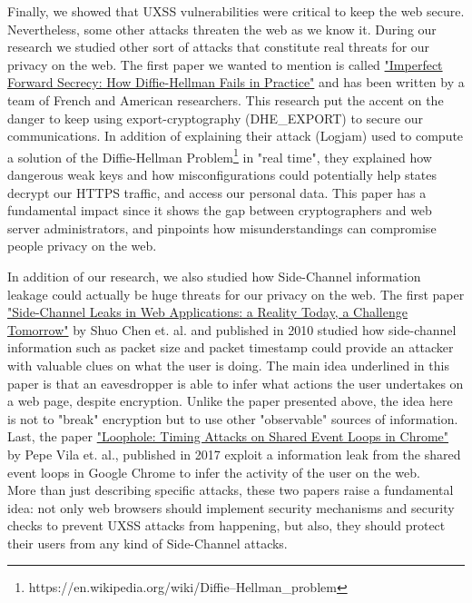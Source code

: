 \documentclass[journal]{IEEEtran}
\begin{document}
Finally, we showed that UXSS vulnerabilities were critical to keep the web secure. Nevertheless, some other attacks threaten the web as we know it. During our research we studied other sort of attacks that constitute real threats for our privacy on the web. The first paper we wanted to mention is called \ul{"Imperfect Forward Secrecy: How Diffie-Hellman Fails in Practice"} and has been written by a team of French and American researchers. This research put the accent on the danger to keep using export-cryptography (DHE\_EXPORT) to secure our communications. In addition of explaining their attack (Logjam) used to compute a solution of the Diffie-Hellman Problem\footnote{https://en.wikipedia.org/wiki/Diffie–Hellman\_problem} in "real time", they explained how dangerous weak keys and how misconfigurations could potentially help states decrypt our HTTPS traffic, and access our personal data. This paper has a fundamental impact since it shows the gap between cryptographers and web server administrators, and pinpoints how misunderstandings can compromise people privacy on the web. 

\medskip

In addition of our research, we also studied how Side-Channel information leakage could actually be huge threats for our privacy on the web. The first paper \ul{"Side-Channel Leaks in Web Applications: a Reality Today, a Challenge Tomorrow"} by Shuo Chen et. al. and published in 2010 studied how side-channel information such as packet size and packet timestamp could provide an attacker with valuable clues on what the user is doing. The main idea underlined in this paper is that an eavesdropper is able to infer what actions the user undertakes on a web page, despite encryption. Unlike the paper presented above, the idea here is not to "break" encryption but to use other "observable" sources of information. \\
Last, the paper \ul{"Loophole: Timing Attacks on Shared Event Loops in Chrome"} by Pepe Vila et. al., published in 2017 exploit a information leak from the shared event loops in Google Chrome to infer the activity of the user on the web. \\
More than just describing specific attacks, these two papers raise a fundamental idea: not only web browsers should implement security mechanisms and security checks to prevent UXSS attacks from happening, but also, they should protect their users from any kind of Side-Channel attacks.

\medskip
\end{document}
